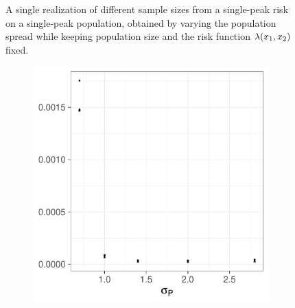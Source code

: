 \begin{figure}[htbp]
\begin{subfigure}{0.45\textwidth}
        \label{fig:one_sample:pop_spread:2.8}
    \end{subfigure}
    \caption[Examples showing population spread]
        {A single realization of different sample sizes from a single-peak risk on a single-peak population, obtained by varying the population \gls{spread} while keeping population size and the risk function $\lambda (x_1, x_2)$ fixed.}
    \label{fig:one_sample:pop_spread}
\end{figure}


\begin{figure}[htbp]
    \centering
    \begin{subfigure}[t]{0.49\textwidth}
        \includegraphics[width=\textwidth]{results/by_population_spread/MISE-vs-population-spread}
        \caption{}
        \label{fig:ise:pop_spread:mise}
    \end{subfigure}
    \begin{subfigure}[t]{0.49\textwidth}

\end{subfigure}
\end{figure}
